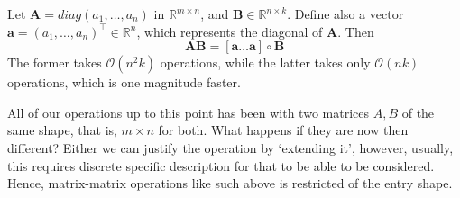 \begin{remark}
    Let $\mathbf{A}=diag(a_{1},\dots,a_{n})$ in $\mathbb{R}^{m\times n}$, and $\mathbf{B}\in\mathbb{R}^{n\times k}$. Define also a vector $\mathbf{a}=(a_{1},\dots,a_{n})^{\top}\in\mathbb{R}^{n}$, which represents the diagonal of $\mathbf{A}$. Then $$\mathbf{AB}=[\mathbf{a}\dots \mathbf{a}]\circ \mathbf{B}$$
The former takes $\mathcal{O}(n^{2}k)$ operations, while the latter takes only $\mathcal{O}(nk)$ operations, which is one magnitude faster. 
\end{remark}
All of our operations up to this point has been with two matrices $A,B$ of the same shape, that is, $m\times n$ for both. What happens if they are now then different? Either we can justify the operation by `extending it', however, usually, this requires discrete specific description for that to be able to be considered. Hence, matrix-matrix operations like such above is restricted of the entry shape. 


